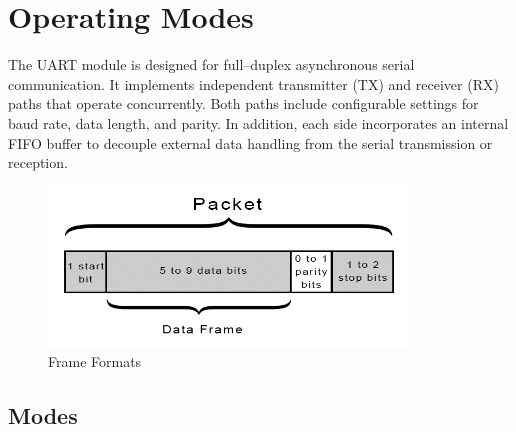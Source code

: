 \section{Operating Modes}

The UART module is designed for full–duplex asynchronous serial communication.
It implements independent transmitter (TX) and receiver (RX) paths that operate concurrently.
Both paths include configurable settings for baud rate, data length, and parity.
In addition, each side incorporates an internal FIFO buffer to decouple external data handling
from the serial transmission or reception.

\begin{figure}[H]
    \centering
    \includegraphics[width=0.85\textwidth]{images/frame_format.png}
    \caption{Frame Formats}
    \label{fig:frame_formats}
  \end{figure}

\subsection{Modes}

